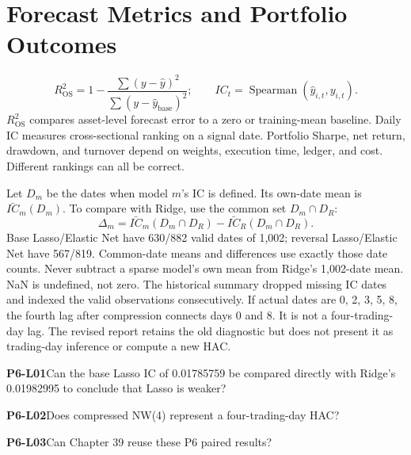 \clearpage\section{Forecast Metrics and Portfolio Outcomes}
\begin{definition}
\[
R^2_{\mathrm{OS}}=1-\frac{\sum (y-\hat y)^2}{\sum (y-\hat y_{\mathrm{base}})^2};
\qquad
IC_t=\operatorname{Spearman}(\hat y_{i,t},y_{i,t}).
\]
\(R^2_{\mathrm{OS}}\) compares asset-level forecast error to a zero or training-mean baseline. Daily IC measures cross-sectional ranking on a signal date. Portfolio Sharpe, net return, drawdown, and turnover depend on weights, execution time, ledger, and cost. Different rankings can all be correct.
\end{definition}
Let \(D_m\) be the dates when model \(m\)'s IC is defined. Its own-date mean is \(\bar{IC}_m(D_m)\). To compare with Ridge, use the common set \(D_m\cap D_R\):
\[
\Delta_m=\bar{IC}_m(D_m\cap D_R)-\bar{IC}_R(D_m\cap D_R).
\]
Base Lasso/Elastic Net have 630/882 valid dates of 1,002; reversal Lasso/Elastic Net have 567/819. Common-date means and differences use exactly those date counts. Never subtract a sparse model's own mean from Ridge's 1,002-date mean. NaN is undefined, not zero.
The historical summary dropped missing IC dates and indexed the valid observations consecutively. If actual dates are 0, 2, 3, 5, 8, the fourth lag after compression connects days 0 and 8. It is not a four-trading-day lag. The revised report retains the old diagnostic but does not present it as trading-day inference or compute a new HAC.
\begin{yourturn}\textbf{P6-L01}\quad Can the base Lasso IC of 0.01785759 be compared directly with Ridge's 0.01982995 to conclude that Lasso is weaker?\workspace[3]\end{yourturn}
\begin{yourturn}\textbf{P6-L02}\quad Does compressed NW(4) represent a four-trading-day HAC?\workspace[3]\end{yourturn}
\begin{yourturn}\textbf{P6-L03}\quad Can Chapter 39 reuse these P6 paired results?\workspace[3]\end{yourturn}

